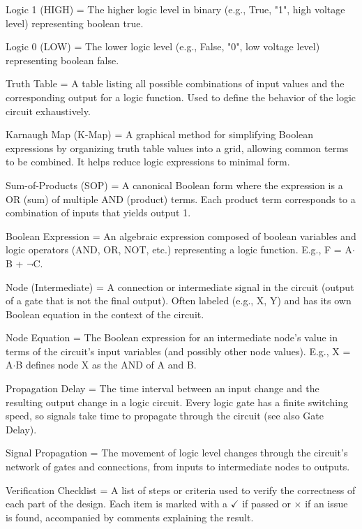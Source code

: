 \documentclass[11pt]{article}
\begin{document}
\noindent Logic 1 (HIGH) = The higher logic level in binary (e.g., True, "1", high voltage level) representing boolean true.

\noindent Logic 0 (LOW)  = The lower logic level (e.g., False, "0", low voltage level) representing boolean false.

\noindent Truth Table = A table listing all possible combinations of input values and the corresponding output for a logic function. Used to define the behavior of the logic circuit exhaustively.

\noindent Karnaugh Map (K-Map) = A graphical method for simplifying Boolean expressions by organizing truth table values into a grid, allowing common terms to be combined. It helps reduce logic expressions to minimal form.

\noindent Sum-of-Products (SOP) = A canonical Boolean form where the expression is a OR (sum) of multiple AND (product) terms. Each product term corresponds to a combination of inputs that yields output 1.

\noindent Boolean Expression = An algebraic expression composed of boolean variables and logic operators (AND, OR, NOT, etc.) representing a logic function. E.g., F = A$\cdot$B + $\lnot$C.

\noindent Node (Intermediate) = A connection or intermediate signal in the circuit (output of a gate that is not the final output). Often labeled (e.g., X, Y) and has its own Boolean equation in the context of the circuit.

\noindent Node Equation = The Boolean expression for an intermediate node's value in terms of the circuit's input variables (and possibly other node values). E.g., X = A$\cdot$B defines node X as the AND of A and B.

\noindent Propagation Delay = The time interval between an input change and the resulting output change in a logic circuit. Every logic gate has a finite switching speed, so signals take time to propagate through the circuit (see also Gate Delay).

\noindent Signal Propagation = The movement of logic level changes through the circuit's network of gates and connections, from inputs to intermediate nodes to outputs.

\noindent Verification Checklist = A list of steps or criteria used to verify the correctness of each part of the design. Each item is marked with a $\checkmark$ if passed or $\times$ if an issue is found, accompanied by comments explaining the result.
\end{document}
